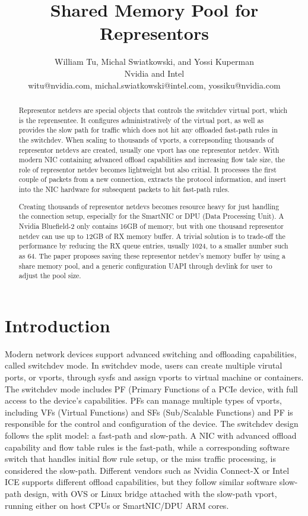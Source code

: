 \documentclass[letterpaper]{article}
\title{Shared Memory Pool for Representors}
\author{William Tu, Michal Swiatkowski, and Yossi Kuperman\\
Nvidia and Intel\\
witu@nvidia.com, michal.swiatkowski@intel.com, yossiku@nvidia.com\\
\newline
\newline
}
\begin{document}
 
\maketitle
\begin{abstract}
Representor netdevs are special objects that controls the switchdev
virtual port, which is the reprensentee. It configures administratively
of the virtual port, as well as provides the slow path for traffic which
does not hit any offloaded fast-path rules in the switchdev.
When scaling to thousands of vports, a correpsonding thousands of
representor netdevs are created, usually one vport has one representor
netdev. With modern NIC containing advanced offload capabilities %
and increasing flow tale size, the role of representor netdev becomes
lightweight but also critial. It processes the first couple of packets
from a new connection, extracts the protocol information, and insert
into the NIC hardware for subsequent packets to hit fast-path rules. 

Creating thousands of representor netdevs becomes resource heavy for
just handling the connection setup, especially for the SmartNIC or
DPU (Data Processing Unit). A Nvidia Bluefield-2 only contains 16GB
of memory, but with one thousand representor netdev can use up to
12GB of RX memory buffer. A trivial solution is to trade-off the
performance by reducing the RX queue entries, usually 1024, to a
smaller number such as 64. The paper proposes saving these representor
netdev's memory buffer by using a share memory pool, and a generic
configuration UAPI through devlink for user to adjust the pool size. 
 
\end{abstract}

\section{Introduction}
Modern network devices support advanced switching and offloading
capabilities, called switchdev mode. In switchdev mode, users can
create multiple virutal ports, or vports, through sysfs and assign
vports to virtual machine or containers. The switchdev mode includes
PF (Primary Functions of a PCIe device, with full access to the device's
capabilities. PFs can manage multiple types of vports, including
VFs (Virtual Functions) and SFs (Sub/Scalable Functions) and PF is
responsible for the control and configuration of the device.
The switchdev design follows the split model: a fast-path and slow-path.
A NIC with advanced offload capability and flow table rules is
the fast-path, while a corresponding software switch that handles
initial flow rule setup, or the miss traffic processing, is considered the
slow-path. Different vendors such as Nvidia Connect-X or Intel ICE
supports different offload capabilities, but they follow similar
software slow-path design, with OVS or Linux bridge attached with
the slow-path vport, running either on host CPUs or SmartNIC/DPU
ARM cores.
\end{document}
